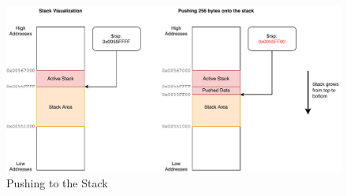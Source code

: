 \begin{figure}[htp!]
    \centering
    \includegraphics[width=\textwidth]{assets/figures/chapter2/stack.pdf}
    \caption{Pushing to the Stack}
    \label{fig:stack}
\end{figure}
